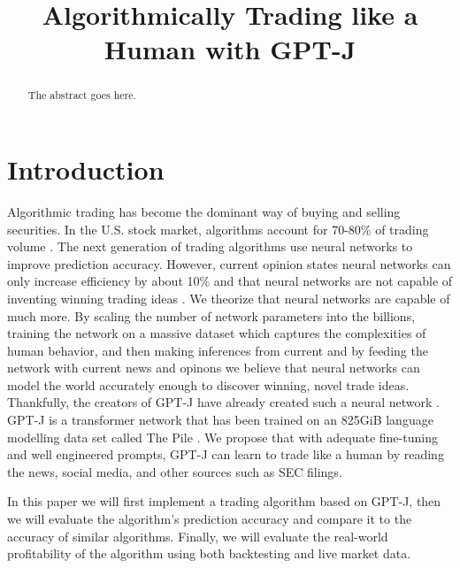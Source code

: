 \documentclass[conference]{IEEEtran}
\begin{document}
\title{Algorithmically Trading like a Human with GPT-J}

\author{
}

\maketitle

\begin{abstract}
The abstract goes here.
\end{abstract}

\section{Introduction}
Algorithmic trading has become the dominant way of buying and selling securities. In the U.S. stock market, algorithms account for 70-80\% of trading volume \cite{Samuelsson2021}. The next generation of trading algorithms use neural networks to improve prediction accuracy. However, current opinion states neural networks can only increase efficiency by about 10\% and that neural networks are not capable of inventing winning trading ideas \cite{Vonko2021}. We theorize that neural networks are capable of much more. By scaling the number of network parameters into the billions, training the network on a massive dataset which captures the complexities of human behavior, and then making inferences from current  and by feeding the network with current news and opinons we believe that neural networks can model the world accurately enough to discover winning, novel trade ideas. Thankfully, the creators of GPT-J have already created such a neural network \cite{mesh-transformer-jax}. GPT-J is a transformer network \cite{Vaswani2017} that has been trained on an 825GiB language modelling data set called The Pile \cite{Gao2021}. We propose that with adequate fine-tuning and well engineered prompts, GPT-J can learn to trade like a human by reading the news, social media, and other sources such as SEC filings.

In this paper we will first implement a trading algorithm based on GPT-J, then we will evaluate the algorithm's prediction accuracy and compare it to the accuracy of similar algorithms. Finally, we will evaluate the real-world profitability of the algorithm using both backtesting and live market data. 
\end{document}
